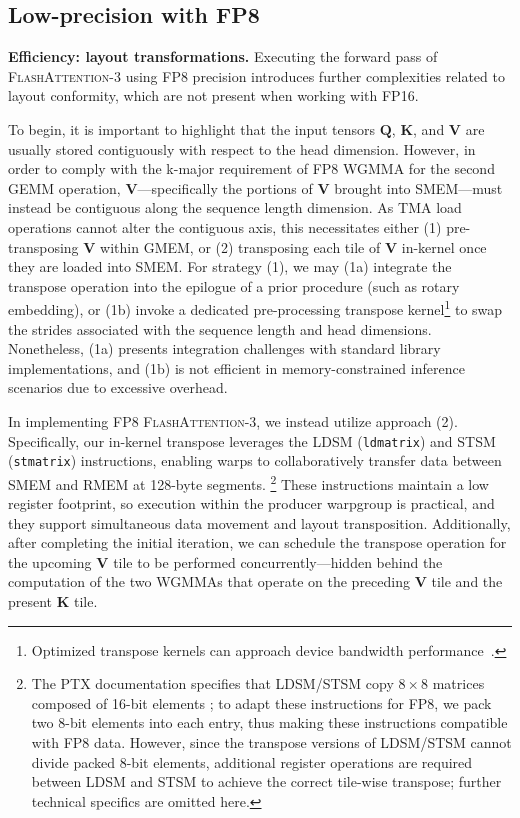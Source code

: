 \subsection{Low-precision with FP8}
\label{sec:algofp8}

\textbf{Efficiency: layout transformations.} Executing the forward pass of \textsc{FlashAttention-3} using FP8 precision introduces further complexities related to layout conformity, which are not present when working with FP16.

To begin, it is important to highlight that the input tensors $\mathbf{Q}$, $\mathbf{K}$, and $\mathbf{V}$ are usually stored contiguously with respect to the head dimension. However, in order to comply with the k-major requirement of FP8 WGMMA for the second GEMM operation, $\mathbf{V}$—specifically the portions of $\mathbf{V}$ brought into SMEM—must instead be contiguous along the sequence length dimension. As TMA load operations cannot alter the contiguous axis, this necessitates either (1) pre-transposing $\mathbf{V}$ within GMEM, or (2) transposing each tile of $\mathbf{V}$ in-kernel once they are loaded into SMEM. For strategy (1), we may (1a) integrate the transpose operation into the epilogue of a prior procedure (such as rotary embedding), or (1b) invoke a dedicated pre-processing transpose kernel\footnote{Optimized transpose kernels can approach device bandwidth performance~\citep{colfax_cutlass_transpose_2024}.} to swap the strides associated with the sequence length and head dimensions. Nonetheless, (1a) presents integration challenges with standard library implementations, and (1b) is not efficient in memory-constrained inference scenarios due to excessive overhead.

In implementing FP8 \textsc{FlashAttention-3}, we instead utilize approach (2). Specifically, our in-kernel transpose leverages the LDSM (\verb|ldmatrix|) and STSM (\verb|stmatrix|) instructions, enabling warps to collaboratively transfer data between SMEM and RMEM at 128-byte segments. \footnote{The PTX documentation specifies that LDSM/STSM copy $8 \times 8$ matrices composed of 16-bit elements \cite[\S 9.7.13.4.15-16]{ptx}; to adapt these instructions for FP8, we pack two 8-bit elements into each entry, thus making these instructions compatible with FP8 data. However, since the transpose versions of LDSM/STSM cannot divide packed 8-bit elements, additional register operations are required between LDSM and STSM to achieve the correct tile-wise transpose; further technical specifics are omitted here.} These instructions maintain a low register footprint, so execution within the producer warpgroup is practical, and they support simultaneous data movement and layout transposition. Additionally, after completing the initial iteration, we can schedule the transpose operation for the upcoming $\mathbf{V}$ tile to be performed concurrently—hidden behind the computation of the two WGMMAs that operate on the preceding $\mathbf{V}$ tile and the present $\mathbf{K}$ tile.

